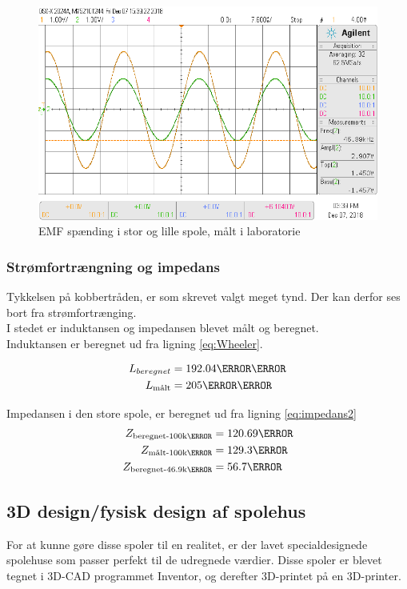 \begin{figure}[h!]
	\centering
	\includegraphics[width=1\textwidth]{billeder/vin_vout_png.png}
	\caption{EMF spænding i stor og lille spole, målt i laboratorie}
	\label{fig:EMF_spole_lab}
\end{figure}
\newpage
\subsubsection{Strømfortrængning og impedans}
Tykkelsen på kobbertråden, er som skrevet valgt meget tynd.
Der kan derfor ses bort fra strømfortrænging.\\
I stedet er induktansen og impedansen blevet målt og beregnet.\\
Induktansen er beregnet ud fra ligning \ref{eq:Wheeler}.

\begin{align}
	 L_{beregnet} &= 192.04\micro\henry\\
     L_{\text{målt}} &= 205\micro\henry
\end{align}

Impedansen i den store spole, er beregnet ud fra ligning \ref{eq:impedans2}
\begin{align}
	 Z_{\text{beregnet-100k\hertz}}&=120.69\ohm\\
	 Z_{\text{målt-100k\hertz}}&=129.3\ohm\\
	 Z_{\text{beregnet-46.9k\hertz}}&= 56.7\ohm               
\end{align}

\subsection{3D design/fysisk design af spolehus}\label{sec:3D_design}
For at kunne gøre disse spoler til en realitet, er der lavet specialdesignede spolehuse som passer perfekt til de udregnede værdier. Disse spoler er blevet tegnet i 3D-CAD programmet Inventor, og derefter 3D-printet på en 3D-printer. \\

